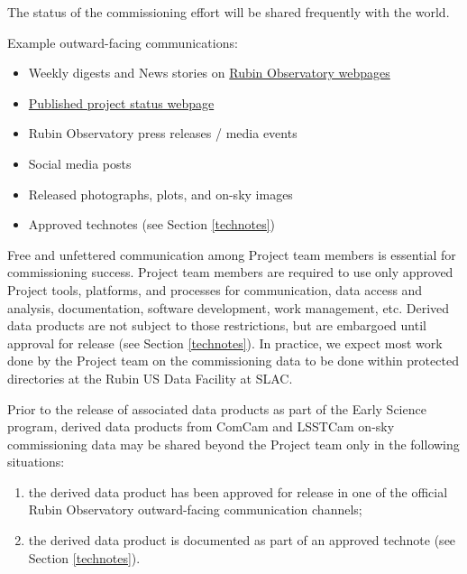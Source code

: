 \documentclass[SE,authoryear,toc,lsstdraft]{lsstdoc}
\begin{document}
The status of the commissioning effort will be shared frequently with the world.

Example outward-facing communications:

\begin{itemize}

  \item Weekly digests and News stories on \href{https://rubinobservatory.org/}{Rubin Observatory webpages}

  \item \href{https://www.lsst.org/about/project-status}{Published project status webpage}

  \item Rubin Observatory press releases / media events

  \item Social media posts

  \item Released photographs, plots, and on-sky images

  \item Approved technotes (see Section \ref{technotes})

\end{itemize}

Free and unfettered communication among Project team members is essential for commissioning success.
Project team members are required to use only approved Project tools, platforms, and processes for communication, data access and analysis, documentation, software development, work management, etc.
Derived data products are not subject to those restrictions, but are embargoed until approval for release (see Section \ref{technotes}).
In practice, we expect most work done by the Project team on the commissioning data to be done within protected directories at the Rubin US Data Facility at SLAC.

Prior to the release of associated data products as part of the Early Science program, derived data products from ComCam and LSSTCam on-sky commissioning data may be shared beyond the Project team only in the following situations:

\begin{enumerate}

  \item the derived data product has been approved for release in one of the official Rubin Observatory outward-facing communication channels;

  \item the derived data product is documented as part of an approved technote (see Section \ref{technotes}).

\end{enumerate}
\end{document}
